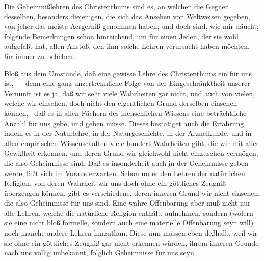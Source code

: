 Die Geheimnißlehren des Christenthums sind es, an welchen die Gegner desselben, besonders diejenigen, die sich das Ansehen von Weltweisen gegeben, von jeher das meiste Aergerniß genommen haben; und doch sind, wie mir däucht, folgende Bemerkungen schon hinreichend, um für einen Jeden, der sie wohl aufgefaßt hat, allen Anstoß, den ihm solche Lehren verursacht haben möchten, für immer zu beheben.
\begin{aufza}
\item Bloß aus dem Umstande, daß eine gewisse Lehre des Christenthums ein  für uns ist, ~\  denn eine ganz unzertrennliche Folge von der Eingeschränktheit unserer Vernunft ist es ja, daß wir sehr viele Wahrheiten gar nicht, und auch von vielen, welche wir einsehen, doch nicht den eigentlichen Grund derselben einsehen können, \dh\ daß es in allen Fächern des menschlichen Wissens eine beträchtliche Anzahl  für uns gebe, und geben müsse. Dieses bestätiget auch die Erfahrung, indem es in der Naturlehre, in der Naturgeschichte, in der Arzneikunde, und in allen empirischen Wissenschaften viele hundert Wahrheiten gibt, die wir mit aller Gewißheit erkennen, und deren Grund wir gleichwohl nicht einzusehen vermögen, die also Geheimnisse sind. Daß es insonderheit auch in der  Geheimnisse geben werde, läßt sich im Voraus erwarten. Schon unter den Lehren der natürlichen Religion, von deren Wahrheit wir uns doch ohne ein göttliches Zeugniß überzeugen können, gibt es verschiedene, deren inneren Grund wir nicht einsehen, die also Geheimnisse für uns sind. Eine wahre Offenbarung aber muß nicht nur alle Lehren, welche die natürliche Religion enthält, aufnehmen, sondern (wofern sie eine nicht bloß formelle, sondern auch eine materielle Offenbarung seyn will) noch manche andere Lehren hinzuthun. Diese nun müssen eben deßhalb, weil wir sie ohne ein göttliches Zeugniß gar nicht erkennen würden, ihrem inneren Grunde nach uns völlig unbekannt, folglich Geheimnisse für uns seyn.

\end{aufza}
